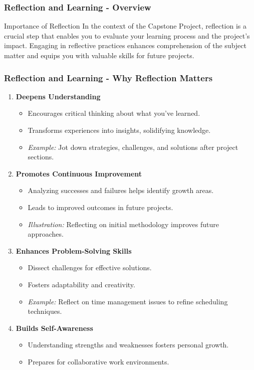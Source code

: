 \documentclass[aspectratio=169]{beamer}
\begin{document}
\begin{frame}[fragile]
    \frametitle{Reflection and Learning - Overview}
    \begin{block}{Importance of Reflection}
        In the context of the Capstone Project, reflection is a crucial step that enables you to evaluate your learning process and the project’s impact. Engaging in reflective practices enhances comprehension of the subject matter and equips you with valuable skills for future projects.
    \end{block}
\end{frame}

\begin{frame}[fragile]
    \frametitle{Reflection and Learning - Why Reflection Matters}
    \begin{enumerate}
        \item \textbf{Deepens Understanding}
        \begin{itemize}
            \item Encourages critical thinking about what you’ve learned.
            \item Transforms experiences into insights, solidifying knowledge.
            \item \textit{Example:} Jot down strategies, challenges, and solutions after project sections.
        \end{itemize}

        \item \textbf{Promotes Continuous Improvement}
        \begin{itemize}
            \item Analyzing successes and failures helps identify growth areas.
            \item Leads to improved outcomes in future projects.
            \item \textit{Illustration:} Reflecting on initial methodology improves future approaches.
        \end{itemize}

        \item \textbf{Enhances Problem-Solving Skills}
        \begin{itemize}
            \item Dissect challenges for effective solutions.
            \item Fosters adaptability and creativity.
            \item \textit{Example:} Reflect on time management issues to refine scheduling techniques.
        \end{itemize}

        \item \textbf{Builds Self-Awareness}
        \begin{itemize}
            \item Understanding strengths and weaknesses fosters personal growth.
            \item Prepares for collaborative work environments.
        \end{itemize}
    \end{enumerate}
\end{frame}
\end{document}
